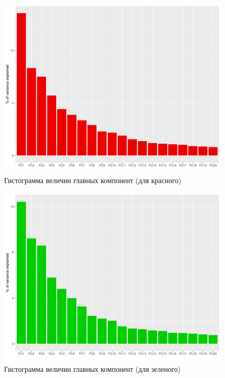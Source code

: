\documentclass[a4paper]{article}
\begin{document}
\begin{figure}[H]
    \centering
    \includegraphics[width = \textwidth]{hists/Redhist_for_Colosseum.pdf}
    \caption{Гистограмма величин главных компонент (для красного)}
    \label{fig:col_r}
\end{figure}
\begin{figure}[H]
    \centering
    \includegraphics[width = \textwidth]{hists/Greenhist_for_Colosseum.pdf}
    \caption{Гистограмма величин главных компонент (для зеленого)}
    \label{fig:col_g}
\end{figure}
\end{document}
